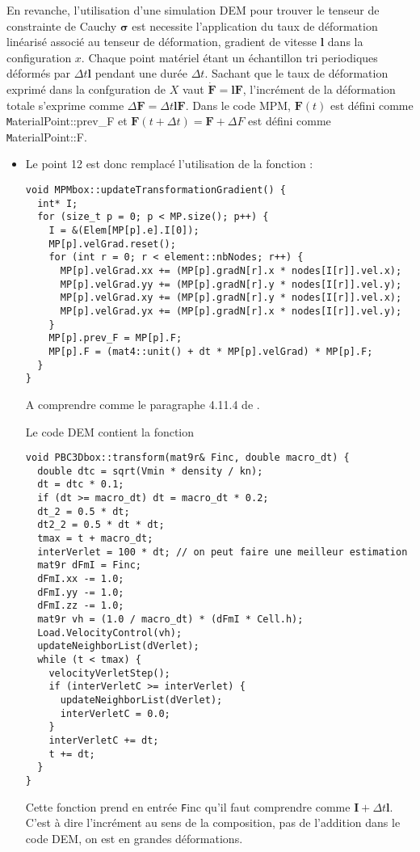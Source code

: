 \documentclass[12pt]{article}
\begin{document}
En revanche, l'utilisation d'une simulation DEM pour trouver le tenseur de constrainte de Cauchy $\boldsymbol \sigma$ est necessite l'application
du taux de déformation linéarisé associé au tenseur de déformation, gradient de vitesse $\boldsymbol l$ dans la configuration $x$. 
Chaque point matériel étant  un échantillon tri periodiques déformés par $\Delta t\boldsymbol l$ pendant une durée $\Delta t$.
Sachant que le taux de déformation exprimé dans la confguration de $X$ vaut $\boldsymbol{\dot F}=\boldsymbol l\boldsymbol F$, 
l'incrément de la déformation totale s'exprime comme $\Delta \boldsymbol F=\Delta t\boldsymbol l \boldsymbol F$. 
Dans le code MPM, $\boldsymbol F(t)$ est défini comme {\texttt MaterialPoint::prev\_F} et 
$\boldsymbol F(t+\Delta t)=\boldsymbol F+ \Delta F$ est défini comme {\texttt MaterialPoint::F}.
\begin{itemize}
\item
Le point 12 est donc remplacé l'utilisation de la fonction : 
\begin{verbatim}
void MPMbox::updateTransformationGradient() {
  int* I;
  for (size_t p = 0; p < MP.size(); p++) {
    I = &(Elem[MP[p].e].I[0]);
    MP[p].velGrad.reset();
    for (int r = 0; r < element::nbNodes; r++) {
      MP[p].velGrad.xx += (MP[p].gradN[r].x * nodes[I[r]].vel.x);
      MP[p].velGrad.yy += (MP[p].gradN[r].y * nodes[I[r]].vel.y);
      MP[p].velGrad.xy += (MP[p].gradN[r].y * nodes[I[r]].vel.x);
      MP[p].velGrad.yx += (MP[p].gradN[r].x * nodes[I[r]].vel.y);
    }
    MP[p].prev_F = MP[p].F;
    MP[p].F = (mat4::unit() + dt * MP[p].velGrad) * MP[p].F;
  }
}
\end{verbatim}
A comprendre comme le paragraphe 4.11.4 de \cite{BonWoo-2008}.

Le code DEM contient la fonction
\begin{verbatim}
void PBC3Dbox::transform(mat9r& Finc, double macro_dt) {
  double dtc = sqrt(Vmin * density / kn);
  dt = dtc * 0.1;
  if (dt >= macro_dt) dt = macro_dt * 0.2;
  dt_2 = 0.5 * dt;
  dt2_2 = 0.5 * dt * dt;
  tmax = t + macro_dt;
  interVerlet = 100 * dt; // on peut faire une meilleur estimation
  mat9r dFmI = Finc;
  dFmI.xx -= 1.0;
  dFmI.yy -= 1.0;
  dFmI.zz -= 1.0;
  mat9r vh = (1.0 / macro_dt) * (dFmI * Cell.h);
  Load.VelocityControl(vh);
  updateNeighborList(dVerlet);
  while (t < tmax) {
    velocityVerletStep();
    if (interVerletC >= interVerlet) {
      updateNeighborList(dVerlet);
      interVerletC = 0.0;
    }
    interVerletC += dt;
    t += dt;
  }
}
\end{verbatim} 
Cette fonction prend en entrée {\texttt Finc} qu'il faut comprendre comme $\boldsymbol I+\Delta t \boldsymbol l$.
C'est à dire l'incrément au sens de la composition, pas de l'addition dans le code DEM, on est en grandes déformations.


\end{itemize}
\end{document}
